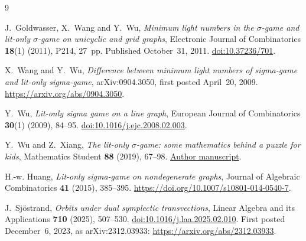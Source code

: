 \documentclass[11pt]{article}
\begin{document}
\begin{thebibliography}{9}

J.~Goldwasser, X.~Wang and Y.~Wu,
\emph{Minimum light numbers in the $\sigma$-game and lit-only $\sigma$-game
on unicyclic and grid graphs},
Electronic Journal of Combinatorics \textbf{18}(1) (2011), P214, 27~pp.
Published October~31, 2011.
\href{https://doi.org/10.37236/701}{doi:10.37236/701}.

X.~Wang and Y.~Wu,
\emph{Difference between minimum light numbers of sigma-game and lit-only
sigma-game},
arXiv:0904.3050, first posted April~20, 2009.
\url{https://arxiv.org/abs/0904.3050}.

Y.~Wu,
\emph{Lit-only sigma game on a line graph},
European Journal of Combinatorics \textbf{30}(1) (2009), 84--95.
\href{https://doi.org/10.1016/j.ejc.2008.02.003}{doi:10.1016/j.ejc.2008.02.003}.

Y.~Wu and Z.~Xiang,
\emph{The lit-only $\sigma$-game: some mathematics behind a puzzle for kids},
Mathematics Student \textbf{88} (2019), 67--98.
\href{https://ziqing.org/data/The\%20lit-only\%20sigma-game\%20-\%20Some\%20Mathematics\%20behind\%20a\%20puzzle\%20for\%20kids.pdf}{Author manuscript}.

H.-w. Huang, \emph{Lit-only sigma-game on nondegenerate graphs},
Journal of Algebraic Combinatorics \textbf{41} (2015), 385--395.
\url{https://doi.org/10.1007/s10801-014-0540-7}.

J.~Sj\"ostrand,
\emph{Orbits under dual symplectic transvections},
Linear Algebra and its Applications \textbf{710} (2025), 507--530.
\href{https://doi.org/10.1016/j.laa.2025.02.010}{doi:10.1016/j.laa.2025.02.010}.
First posted December~6, 2023, as arXiv:2312.03933:
\url{https://arxiv.org/abs/2312.03933}.

\end{thebibliography}
\end{document}
